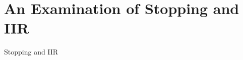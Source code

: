 
\chapter[Stopping and IIR]{An Examination of Stopping and IIR}\label{chap:stopping_background}
Stopping and IIR